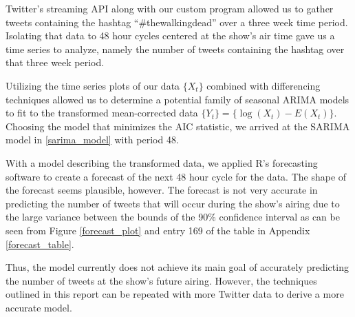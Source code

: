 Twitter's streaming API along with our custom program allowed us to gather tweets
containing the hashtag ``\#thewalkingdead'' over a three week time period. Isolating
that data to 48 hour cycles centered at the show's air time gave us a time series
to analyze, namely the number of tweets containing the hashtag over that three week period.

Utilizing the time series plots of our data $\{X_t\}$ combined with differencing
techniques allowed us to determine a potential family of seasonal ARIMA models
to fit to the transformed mean-corrected data $\{Y_t\} = \{\log(X_t) - E(X_t)\}$.
Choosing the model that minimizes the AIC statistic, we arrived at the SARIMA
model in \eqref{sarima_model} with period 48.

With a model describing the transformed data, we applied R's forecasting software
to create a forecast of the next 48 hour cycle for the data. The shape of the forecast
seems plausible, however. The forecast is not very accurate in predicting the number of
tweets that will occur during the show's airing due to the large variance between the
bounds of the 90\% confidence interval as can be seen from Figure \ref{forecast_plot}
and entry 169 of the table in Appendix \ref{forecast_table}.

Thus, the model currently does not achieve its main goal of accurately predicting the number of
tweets at the show's future airing. However, the techniques outlined in this
report can be repeated with more Twitter data to derive a more accurate model.
